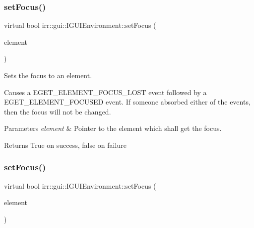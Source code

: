 \subsubsection{\texorpdfstring{set\+Focus()}{setFocus()}\hspace{0.1cm}{\footnotesize\ttfamily [1/2]}}
{\footnotesize\ttfamily virtual bool irr\+::gui\+::\+I\+G\+U\+I\+Environment\+::set\+Focus (\begin{DoxyParamCaption}\item[{\hyperlink{classirr_1_1gui_1_1IGUIElement}{I\+G\+U\+I\+Element} $\ast$}]{element }\end{DoxyParamCaption})\hspace{0.3cm}{\ttfamily [pure virtual]}}



Sets the focus to an element. 

Causes a E\+G\+E\+T\+\_\+\+E\+L\+E\+M\+E\+N\+T\+\_\+\+F\+O\+C\+U\+S\+\_\+\+L\+O\+ST event followed by a E\+G\+E\+T\+\_\+\+E\+L\+E\+M\+E\+N\+T\+\_\+\+F\+O\+C\+U\+S\+ED event. If someone absorbed either of the events, then the focus will not be changed. 
\begin{DoxyParams}{Parameters}
{\em element} & Pointer to the element which shall get the focus. \\
\hline
\end{DoxyParams}
\begin{DoxyReturn}{Returns}
True on success, false on failure 
\end{DoxyReturn}
\mbox{\label{classirr_1_1gui_1_1IGUIEnvironment_a2bfe9985ae1a2f379e708fce86902cea}} 
\subsubsection{\texorpdfstring{set\+Focus()}{setFocus()}\hspace{0.1cm}{\footnotesize\ttfamily [2/2]}}
{\footnotesize\ttfamily virtual bool irr\+::gui\+::\+I\+G\+U\+I\+Environment\+::set\+Focus (\begin{DoxyParamCaption}\item[{\hyperlink{classirr_1_1gui_1_1IGUIElement}{I\+G\+U\+I\+Element} $\ast$}]{element }\end{DoxyParamCaption})\hspace{0.3cm}{\ttfamily [pure virtual]}}



